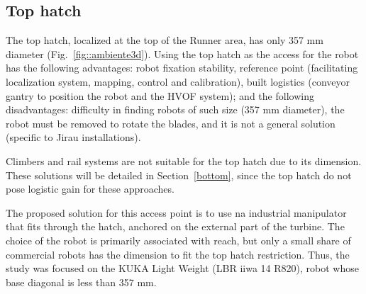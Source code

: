 \subsection{Top hatch}
The top hatch, localized at the top of the Runner area, has only 357 mm
diameter (Fig.~\ref{fig::ambiente3d}). Using the top hatch as
the access for the robot has the following advantages: robot fixation stability,
reference point (facilitating localization system, mapping, control and
calibration), built logistics (conveyor gantry to position the robot and the
HVOF system); and the following disadvantages: difficulty in finding robots of
such size (357 mm diameter), the robot must be removed to rotate the blades, and
it is not a general solution (specific to Jirau installations).



Climbers and rail systems are not suitable for the top hatch due to
its dimension. These solutions will be detailed in Section~\ref{bottom}, since
the top hatch do not pose logistic gain for these approaches.

The proposed solution for this access point is to use na industrial manipulator
that fits through the hatch, anchored on the external part of the turbine.  The choice of the robot is primarily associated with reach, but
only a small share of commercial robots has the dimension to fit the top hatch restriction.
Thus, the study was focused on the KUKA Light Weight (LBR iiwa 14 R820), robot whose base
diagonal is less than 357 mm.

